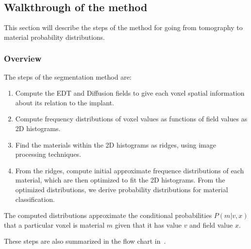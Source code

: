 
\subsection{Walkthrough of the method}
This section will describe the steps of the method for going from tomography to material probability distributions.

\subsubsection{Overview}
The steps of the segmentation method are:
\begin{enumerate}
    \item Compute the EDT and Diffusion fields to give each voxel spatial information about its relation to the implant.
    \item Compute frequency distributions of voxel values as functions of field values
      as 2D histograms.
    \item Find the materials within the 2D histograms as ridges, using image processing techniques.
    \item From the ridges, compute initial approximate frequence distributions of each material,
      which are then optimized to fit the 2D histograms. From the optimized distributions, we derive
      probability distributions for material classification.
\end{enumerate}
The computed distributions approximate the conditional probabilities $P(m|v,x)$ that a particular voxel
is material $m$ given that it has value $v$ and field value $x$. 


These steps are also summarized in the flow chart in~.


